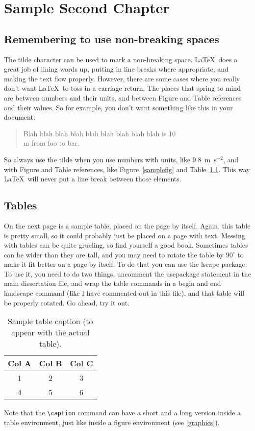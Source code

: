 \chapter{Sample Second Chapter\label{chap2}}

\section{Remembering to use non-breaking spaces}

The tilde character can be used to mark a non-breaking space.  \LaTeX\
does a great job of lining words up, putting in line breaks where
appropriate, and making the text flow properly.  However, there are
some cases where you really don't want \LaTeX\ to toss in a carriage
return.  The places that spring to mind are between numbers and
their units, and between Figure and Table references and their
values.  So for example, you don't want something like this in your
document:

\begin{quote}
	Blah blah blah blah blah blah blah blah blah is 10\\
	m from foo to bar.
\end{quote}

So always use the tilde when you use numbers with units, like
9.8~m~s$^{-2}$, and with Figure and Table references, like
Figure~\ref{samplefig} and Table~\ref{sampletable}.  This way \LaTeX\
will never put a line break between those elements.


\section{Tables\label{tables}}

On the next page is a sample table, placed on the page by itself.
Again, this table is pretty small, so it could probably just be
placed on a page with text.  Messing with tables can be quite
grueling, so find yourself a good book.  Sometimes tables can be
wider than they are tall, and you may need to rotate the table by
$90^{\circ}$ to make it fit better on a page by itself.  To do that
you can use the lscape package.  To use it, you need to do two
things, uncomment the usepackage statement in the main dissertation
file, and wrap the table commands in a begin and end landscape
command (like I have commented out in this file), and that table
will be properly rotated.  Go ahead, try it out.

\begin{table}[p!]
\begin{center}
\caption[Short table caption for LOT]{Sample table caption (to appear with the actual table). \label{sampletable}}
\vspace{0.3in}
\begin{tabular}{ccc}
\hline 
\hline
Col A & Col B & Col C \\
\hline
1 & 2 & 3 \\
4 & 5 & 6\\
\hline
\end{tabular}
\end{center}
\end{table}

Note that the \verb=\caption= command can have a short and a long version
inside a table environment, just like inside a figure environment (see \ref{graphics}).
